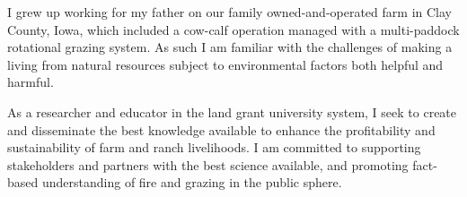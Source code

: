 I grew up working for my father on our family owned-and-operated farm in Clay County, Iowa, which included a cow-calf operation managed with a multi-paddock rotational grazing system. 
As such I am familiar with the challenges of making a living from natural resources subject to environmental factors both helpful and harmful. 

As a researcher and educator in the land grant university system, I seek to create and disseminate the best knowledge available to enhance the profitability and sustainability of farm and ranch livelihoods. 
I am committed to supporting stakeholders and partners with the best science available, and promoting fact-based understanding of fire and grazing in the public sphere. 